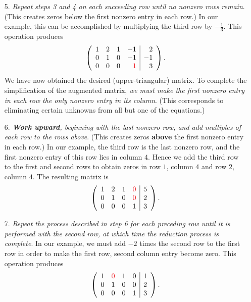 \begin{remark}
\begin{enumerate}
\[    \]
\item[5.] \emph{Repeat steps 3 and 4 on each succeeding row until no nonzero rows remain}.
    (This creates zeros below the first nonzero entry in each row.)
    In our example, this can be accomplished by multiplying the third row by \(-\frac1{3}\).
    This operation produces
    \[
        \left(\begin{array}{rrrr|r}
            1 & 2 & 1 & -1 & 2 \\
            0 & 1 & 0 & -1 & -1 \\
            0 & 0 & 0 & \RED{1} & 3
        \end{array}\right).
    \]
We have now obtained the desired (upper-triangular) matrix.
To complete the simplification of the augmented matrix, \emph{we must make the first nonzero entry in each row the only nonzero entry in its column}.
(This corresponds to eliminating certain unknowns from all but one of the equations.)
\item[6.] \emph{\textbf{Work upward}, beginning with the last nonzero row, and add multiples of each row to the rows above}.
    (This creates zeros \textbf{above} the first nonzero entry in each row.)
    In our example, the third row is the last nonzero row, and the first nonzero entry of this row lies in column \(4\).
    Hence we add the third row to the first and second rows to obtain zeros in row \(1\), column \(4\) and row \(2\), column \(4\).
    The resulting matrix is
    \[
        \left(\begin{array}{rrrr|r}
            1 & 2 & 1 & \RED{0} & 5 \\
            0 & 1 & 0 & \RED{0} & 2 \\
            0 & 0 & 0 & 1 & 3
        \end{array}\right).
    \]
\item[7.] \emph{Repeat the process described in step 6 for each preceding row until it is performed with the second row, at which time the reduction process is complete}.
    In our example, we must add \(-2\) times the second row to the first row in order to make the first row, second column entry become zero. This operation produces
    \[
        \left(\begin{array}{rrrr|r}
            1 & \RED{0} & 1 & 0 & 1 \\
            0 & 1 & 0 & 0 & 2 \\
            0 & 0 & 0 & 1 & 3
        \end{array}\right).
    \]
\end{enumerate}

\end{remark}
